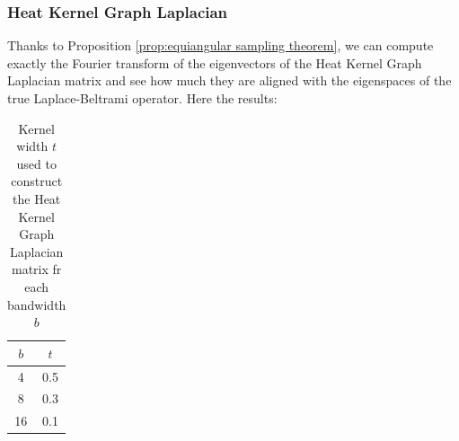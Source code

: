 \subsubsection{Heat Kernel Graph Laplacian}
Thanks to Proposition \ref{prop:equiangular sampling theorem}, we can compute exactly the Fourier transform of the eigenvectors of the Heat Kernel Graph Laplacian matrix and see how much they are aligned with the eigenspaces of the true Laplace-Beltrami operator. Here the results:


\begin{table}[h!]
	\centering
	\label{table:equiangular kernel width}
	\caption{Kernel width $t$ used to construct the Heat Kernel Graph Laplacian matrix fr each bandwidth $b$}
	\begin{tabular}{ c|c } 
	
$b$ & $t$ \\ 
	\hline
4 & 0.5 \\ 
8 & 0.3 \\ 
16 & 0.1 \\ 
	
	\end{tabular}
\end{table}

